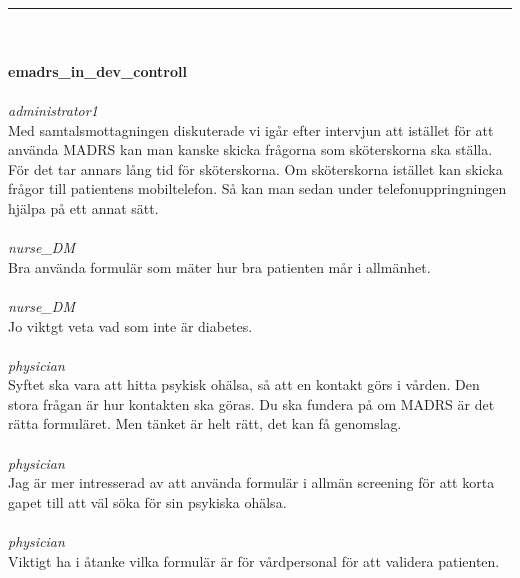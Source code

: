 \documentclass[12pt,a4paper,oneside]{article}
\begin{document}
\ \vspace{.66em}\\
\hrule
\ \vspace{.33em}\\
\ \\{\bf emadrs\_in\_dev\_controll }
\\\ \\%
 { \it administrator1 %
}\\ 
Med samtalsmottagningen diskuterade vi ig{\aa}r efter intervjun att ist{\"a}llet f{\"o}r att anv{\"a}nda MADRS kan man kanske skicka fr{\aa}gorna som sk{\"o}terskorna ska st{\"a}lla. F{\"o}r det tar annars l{\aa}ng tid f{\"o}r sk{\"o}terskorna. Om sk{\"o}terskorna ist{\"a}llet kan skicka fr{\aa}gor till patientens mobiltelefon. S{\aa} kan man sedan under telefonuppringningen hj{\"a}lpa p{\aa} ett annat s{\"a}tt.  %
\ \\\ \\
 { \it   nurse\_DM %
}\\ 
Bra anv{\"a}nda formul{\"a}r som m{\"a}ter hur bra patienten m{\aa}r i allm{\"a}nhet.  %
\ \\\ \\
 { \it   nurse\_DM %
}\\ 
Jo viktgt veta vad som inte {\"a}r diabetes. %
\ \\\ \\
 { \it   physician %
}\\ 
 Syftet ska vara att hitta psykisk oh{\"a}lsa, s{\aa} att en kontakt g{\"o}rs i v{\aa}rden. Den stora fr{\aa}gan {\"a}r hur kontakten ska g{\"o}ras. Du ska fundera p{\aa} om MADRS {\"a}r det r{\"a}tta formul{\"a}ret. Men t{\"a}nket {\"a}r helt r{\"a}tt, det kan f{\aa} genomslag.  %
\ \\\ \\
 { \it   physician %
}\\ 
Jag {\"a}r mer intresserad av att anv{\"a}nda formul{\"a}r i allm{\"a}n screening f{\"o}r att korta gapet till att v{\"a}l s{\"o}ka f{\"o}r sin psykiska oh{\"a}lsa.  %
\ \\\ \\
 { \it   physician %
}\\ 
Viktigt ha i {\aa}tanke vilka formul{\"a}r {\"a}r f{\"o}r v{\aa}rdpersonal f{\"o}r att validera patienten. %
\end{document}
